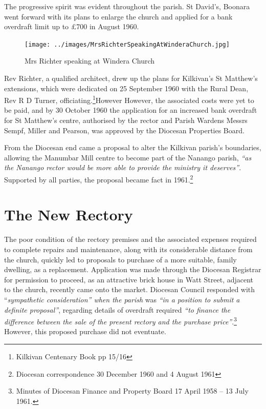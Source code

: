 The progressive spirit was evident throughout the parish. St David's, Boonara went forward with its plans to enlarge the church and applied for a bank overdraft limit up to \pounds700 in August 1960.









\begin{figure}[!htb]
\begin{center}
\texttt{[image: ../images/MrsRichterSpeakingAtWinderaChurch.jpg]}
\caption{Mrs Richter speaking at Windera Church}
\end{center}
\end{figure}




Rev Richter, a qualified architect, drew up the plans for Kilkivan's St Matthew's extensions, which were dedicated on 25 September 1960 with the Rural Dean, Rev R D Turner, officiating.\footnote{Kilkivan Centenary Book pp 15/16}However However, the associated costs were yet to be paid, and by 30 October 1960 the application for an increased bank overdraft for St Matthew's centre, authorised by the rector and Parish Wardens Messrs Sempf, Miller and Pearson, was approved by the Diocesan Properties Board.


From the Diocesan end came a proposal to alter the Kilkivan parish's boundaries, allowing the Manumbar Mill centre to become part of the Nanango parish, \emph{``as the Nanango rector would be more able to provide the ministry it deserves''}. Supported by all parties, the proposal became fact in 1961.\footnote{Diocesan correspondence 30 December 1960 and 4 August 1961}


\section{The New Rectory}



The poor condition of the rectory premises and the associated expenses required to complete repairs and maintenance, along with its considerable distance from the church, quickly led to proposals to purchase of a more suitable, family dwelling, as a replacement. Application was made through the Diocesan Registrar for permission to proceed, as an attractive brick house in Watt Street, adjacent to the church, recently came onto the market. Diocesan Council responded with ``\emph{sympathetic consideration'' when the parish} was \emph{``in a position to submit a definite proposal''}, regarding details of overdraft required \emph{``to finance the difference between the sale of the present rectory and the purchase price''}.\footnote{Minutes of Diocesan Finance and Property Board 17 April 1958 -- 13 July 1961.} However, this proposed purchase did not eventuate.








